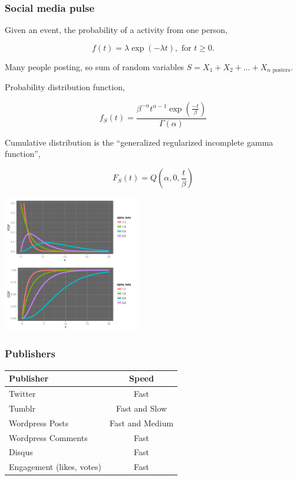 \documentclass{beamer}
\begin{document}
\begin{frame}
\frametitle{Social media pulse} 
Given an event, the probability of a activity from one person,

\begin{equation*}
f(t) = \lambda \exp(-\lambda t), \text{ for } t \geq 0.
\end{equation*}

Many people posting, so sum of random variables $S = X_1 + X_2 + \ldots + X_{n \text{ posters}}$.

Probability distribution function,

\begin{equation*}
f_S(t) = \frac{ \beta^{-\alpha} t^{\alpha-1} \exp( \frac{-t}{\beta}) } {\Gamma(\alpha)}
\end{equation*}

Cumulative distribution is the ``generalized regularized incomplete gamma function'',

\begin{equation*}
F_S(t) = Q(\alpha, 0, \frac{ t}{\beta})
\end{equation*}
\end{frame}


\begin{frame}
  \begin{center}
   \includegraphics[height=6cm]{./imgs/gammadist.pdf}
  \end{center}
\end{frame}

\begin{frame} \frametitle{Publishers}
\begin{table}
\begin{tabular}{l|c}
\hline
   {Publisher}   &   {Speed} \\
\hline 
    Twitter      &    Fast  \\ 
    Tumblr      &        Fast and Slow \\
    Wordpress Posts &   Fast and Medium   \\
    Wordpress Comments & Fast\\
    Disqus       &    Fast\\
    Engagement (likes, votes) &  Fast\\
\hline
\end{tabular}
\end{table}
\end{frame}
\end{document}
